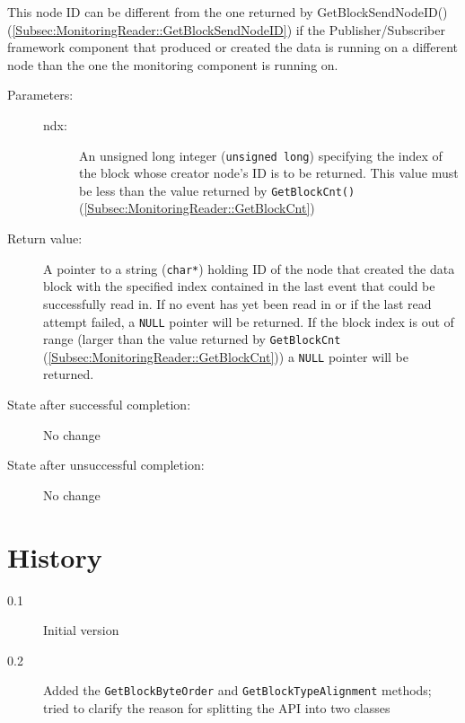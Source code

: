\documentclass[a4paper,twoside]{article}
\begin{document}
This node ID can be different from the one returned by GetBlockSendNodeID() (\ref{Subsec:MonitoringReader::GetBlockSendNodeID}) if the Publisher/Subscriber
framework component that produced or created the data is running on a different node than the one the monitoring component is running on.

\begin{description}
\item[Parameters:]
	\begin{description}
		\item[ndx:] An unsigned long integer (\texttt{unsigned long}) specifying the index of the block whose creator node's ID is 
		to be returned. This value must be less than the value returned by \texttt{GetBlockCnt()} (\ref{Subsec:MonitoringReader::GetBlockCnt})
	\end{description}
\item[Return value:] A pointer to a string (\texttt{char*}) holding ID of the node that created the data block
with the specified index contained in the last event that could be successfully read in. 
If no event has yet been read in or if the last read attempt failed, a \texttt{NULL} pointer will be returned.
If the block index is out of range (larger than the value returned by \texttt{GetBlockCnt} (\ref{Subsec:MonitoringReader::GetBlockCnt}))
a \texttt{NULL} pointer will be returned.
\item[State after successful completion:] No change
\item[State after unsuccessful completion:] No change
\end{description}

\section{History}

\begin{description}
\item[0.1] Initial version
\item[0.2] Added the \texttt{GetBlockByteOrder} and \texttt{GetBlockTypeAlignment} methods; tried to clarify the reason for splitting the API into two classes
\end{description}
\end{document}
